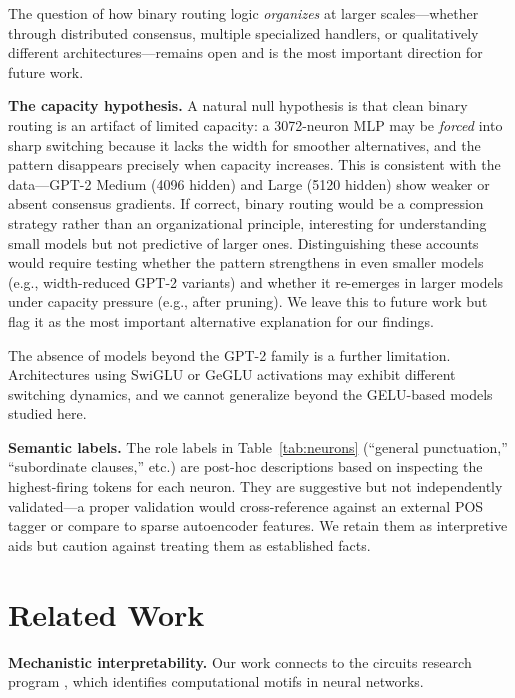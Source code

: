 \documentclass{article}
\begin{document}
The question of how binary routing logic \emph{organizes} at larger scales---whether through
distributed consensus, multiple specialized handlers, or qualitatively different
architectures---remains open and is the most important direction for future work.

\textbf{The capacity hypothesis.} A natural null hypothesis is that clean binary routing is an
artifact of limited capacity: a 3072-neuron MLP may be \emph{forced} into sharp switching
because it lacks the width for smoother alternatives, and the pattern disappears precisely when
capacity increases. This is consistent with the data---GPT-2 Medium (4096 hidden) and Large
(5120 hidden) show weaker or absent consensus gradients. If correct, binary routing would be a
compression strategy rather than an organizational principle, interesting for understanding
small models but not predictive of larger ones. Distinguishing these accounts would require
testing whether the pattern strengthens in even smaller models (e.g., width-reduced GPT-2
variants) and whether it re-emerges in larger models under capacity pressure (e.g., after
pruning). We leave this to future work but flag it as the most important alternative explanation
for our findings.

The absence of models beyond the GPT-2 family is a further limitation. Architectures using
SwiGLU or GeGLU activations \citep{shazeer2020glu} may exhibit different switching dynamics,
and we cannot generalize beyond the GELU-based models studied here.

\textbf{Semantic labels.} The role labels in Table~\ref{tab:neurons} (``general punctuation,''
``subordinate clauses,'' etc.) are post-hoc descriptions based on inspecting the highest-firing
tokens for each neuron. They are suggestive but not independently validated---a proper validation
would cross-reference against an external POS tagger or compare to sparse autoencoder features.
We retain them as interpretive aids but caution against treating them as established facts.

\section{Related Work}

\textbf{Mechanistic interpretability.}
Our work connects to the circuits research program \citep{olah2020zoom, elhage2021mathematical},
which identifies computational motifs in neural networks.
\end{document}
